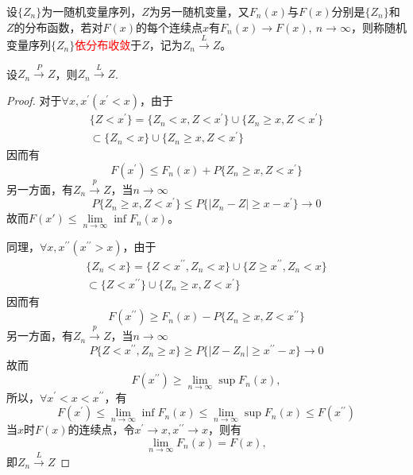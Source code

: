 \begin{definition}[依分布收敛]
    设$\{ Z_n \}$为一随机变量序列，$Z$为另一随机变量，又$F_n(x)$与$F(x)$分别是$\{ Z_n \}$和$Z$的分布函数，若对$F(x)$的每个连续点$x$有$F_n(x)\rightarrow F(x),\ n\rightarrow \infty$，则称随机变量序列$\{ Z_n \}$\textcolor{red}{依分布收敛}于$Z$，记为$Z_n \overset{L}{\rightarrow} Z$。
\end{definition}

\begin{theorem}
    设$Z_n\xrightarrow{P}Z$，则$Z_n\xrightarrow{L}Z$.
\end{theorem}

\begin{proof}
    对于$\forall x,x^{\prime}\left(x^{\prime}<x\right)$，由于
    \[
        \begin{gathered}
            \{Z<x^{\prime}\} =\{Z_{n}<x,Z<x^{\prime}\}\cup\{Z_{n}\geq x,Z<x^{\prime}\} \\
            \subset\{Z_{n}<x\}\cup\{Z_{n}\geq x,Z<x^{\prime}\} 
            \end{gathered}
    \]
    因而有
    \[
        F(x^{\prime})\leqslant F_{n}(x)+P\{Z_{n}\geqslant x,Z<x^{\prime}\}
    \]
    另一方面，有$Z_{n}\xrightarrow{p}Z$，当$n\rightarrow \infty$
    \[
        P\{Z_{n}\geqslant x,Z<x^{\prime}\}\leqslant P\{|Z_{n}-Z|\geqslant x-x^{\prime}\}\rightarrow0
    \]
    故而$F(x')\leqslant\lim\limits_{n\to\infty}\inf F_n(x)$。

    同理，$\forall x,x^{\prime\prime}\left(x^{\prime\prime}>x\right)$，由于
    \[
        \begin{gathered}
            \{Z_{n}<x\} =\{Z<x^{\prime\prime},Z_{n}<x\}\cup\{Z\geqslant x^{\prime\prime},Z_{n}< x\} \\
            \subset\{Z<x^{\prime\prime}\}\cup\{Z_{n}\geq x,Z<x^{\prime}\} 
            \end{gathered}
    \]
    因而有
    \[
        F(x^{\prime\prime})\geqslant F_{n}(x)-P\{Z_{n}\geqslant x,Z<x^{\prime\prime}\} 
    \]
    另一方面，有$Z_{n}\xrightarrow{p}Z$，当$n\rightarrow \infty$
    \[
        P\{Z<x^{\prime\prime}, Z_{n}\geqslant x\}\geqslant P\{|Z-Z_n|\geqslant x^{\prime\prime} - x\}\rightarrow 0
    \]
    故而
    \[
        F(x^{\prime\prime})\geq \lim\limits_{n\to\infty}\sup F_{n}(x),
    \]
    所以，$\forall x^{\prime}<x<x^{\prime\prime}$，有
    \[
        F(x^{\prime})\leq\lim_{n\to\infty}\inf F_{n}(x)\leq\lim_{n\to\infty}\sup F_{n}(x)\leq F(x^{\prime\prime})
    \]
    当$x$时$F(x)$的连续点，令$x^{\prime}\to x,x^{\prime\prime}\to x$，则有
    \[
        \lim\limits_{n\to\infty} F_{n}(x)=F(x),
    \]
    即$Z_n\xrightarrow{L}Z$
\end{proof}

